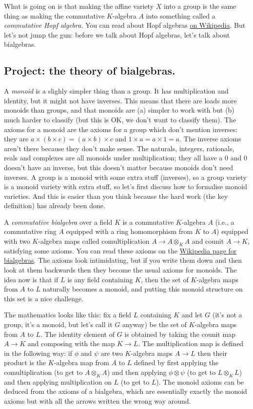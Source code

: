 \documentclass{amsart}
\begin{document}
What is going on is that making the affine variety $X$ into a group is the same thing as making the commutative $K$-algebra $A$ into something called a \emph{commutative Hopf algebra}. You can read about Hopf algebras \href{https://en.wikipedia.org/wiki/Hopf_algebra}{on Wikipedia}. But let's not jump the gun: before we talk about Hopf algebras, let's talk about bialgebras.

\subsection{Project: the theory of bialgebras.}

A \emph{monoid} is a slighly simpler thing than a group. It has multiplication and identity, but it might not have inverses. This means that there are loads more monoids than groups, and that monoids are (a) simpler to work with but (b) much harder to classify (but this is OK, we don't want to classify them). The axioms for a monoid are the axioms for a group which don't mention inverses: they are $a\times(b\times c)=(a\times b)\times c$ and $1\times a=a\times 1=a$. The inverse axioms aren't there because they don't make sense. The naturals, integers, rationals, reals and complexes are all monoids under multiplication; they all have a 0 and 0 doesn't have an inverse, but this doesn't matter because monoids don't need inverses. A group is a monoid with some extra stuff (inverses), so a group variety is a monoid variety with extra stuff, so let's first discuss how to formalise monoid varieties. And this is easier than you think because the hard work (the key definition) has already been done.

A \emph{commutative bialgebra} over a field $K$ is a commutative $K$-algebra $A$ (i.e., a commutative ring $A$ equipped with a ring homomorphism from $K$ to $A$) equipped with two $K$-algebra maps called comultiplication $A\to A \otimes_KA$ and counit $A\to K$, satisfying some axioms. You can read these axioms on the \href{https://en.wikipedia.org/wiki/Bialgebra}{Wikipedia page for bialgebras}. The axioms look intimidating, but if you write them down and then look at them backwards then they become the usual axioms for monoids. The idea now is that if $L$ is any field containing $K$, then the set of $K$-algebra maps from $A$ to $L$ naturally becomes a monoid, and putting this monoid structure on this set is a nice challenge.

The mathematics looks like this: fix a field $L$ containing $K$ and let $G$ (it's not a group, it's a monoid, but let's call it $G$ anyway) be the set of $K$-algebra maps from $A$ to $L$. The identity element of $G$ is obtained by taking the counit map $A\to K$ and composing with the map $K\to L$. The multiplication map is defined in the following way: if $\phi$ and $\psi$ are two $K$-algebra maps $A\to L$ then their product is the $K$-algebra map from $A$ to $L$ defined by first applying the comultiplication (to get to $A\otimes_K A$) and then applying $\phi\otimes\psi$ (to get to $L\otimes_K L$) and then applying multiplication on $L$ (to get to $L$). The monoid axioms can be deduced from the axioms of a bialgebra, which are essentially exactly the monoid axioms but with all the arrows written the wrong way around.
\end{document}
